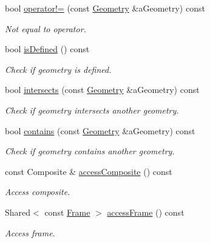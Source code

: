 \begin{DoxyCompactItemize}
bool \hyperlink{classostk_1_1physics_1_1env_1_1object_1_1_geometry_ae47daffb1f1e7341706a771dce7bd2f2}{operator!=} (const \hyperlink{classostk_1_1physics_1_1env_1_1object_1_1_geometry}{Geometry} \&a\+Geometry) const
\begin{DoxyCompactList}\small\item\em Not equal to operator. \end{DoxyCompactList}\item 
bool \hyperlink{classostk_1_1physics_1_1env_1_1object_1_1_geometry_a46e3f9e3a85efd77a4df11fdfb544f4d}{is\+Defined} () const
\begin{DoxyCompactList}\small\item\em Check if geometry is defined. \end{DoxyCompactList}\item 
bool \hyperlink{classostk_1_1physics_1_1env_1_1object_1_1_geometry_adab144d62681369d1d456264dcab043c}{intersects} (const \hyperlink{classostk_1_1physics_1_1env_1_1object_1_1_geometry}{Geometry} \&a\+Geometry) const
\begin{DoxyCompactList}\small\item\em Check if geometry intersects another geometry. \end{DoxyCompactList}\item 
bool \hyperlink{classostk_1_1physics_1_1env_1_1object_1_1_geometry_ab08322d5d7639f1e22c0d6c2999c7e28}{contains} (const \hyperlink{classostk_1_1physics_1_1env_1_1object_1_1_geometry}{Geometry} \&a\+Geometry) const
\begin{DoxyCompactList}\small\item\em Check if geometry contains another geometry. \end{DoxyCompactList}\item 
const Composite \& \hyperlink{classostk_1_1physics_1_1env_1_1object_1_1_geometry_a993e5e8bd11e214ad6e3aee10c05cca4}{access\+Composite} () const
\begin{DoxyCompactList}\small\item\em Access composite. \end{DoxyCompactList}\item 
Shared$<$ const \hyperlink{classostk_1_1physics_1_1coord_1_1_frame}{Frame} $>$ \hyperlink{classostk_1_1physics_1_1env_1_1object_1_1_geometry_a5605bf833c7647eba5c32a88498876cb}{access\+Frame} () const
\begin{DoxyCompactList}\small\item\em Access frame. \end{DoxyCompactList}\item 

\end{DoxyCompactItemize}
